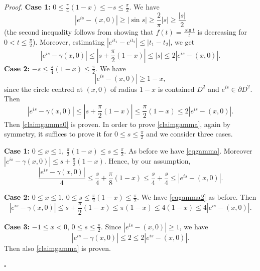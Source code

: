 \documentclass[12pt, a4paper]{article}
\newenvironment{proof}{\noindent\emph{Proof.}}{\hfill$\square$\medskip}
\renewcommand{\(}{\left(}
\renewcommand{\)}{\right)}
\begin{document}
\begin{proof}
\noindent\textbf{Case 1:} $0\le \frac{\pi}{4}(1-x)\le -s\le\frac{\pi}{2}$. 
We have
\begin{equation}\label{eqgamma}
|e^{is}-(x,0)|\ge |\sin s| \ge \frac{2}{\pi}|s|\ge\frac{|s|}{2}
\end{equation}
(the second inequality follows from showing that $f(t)=\frac{\sin t}{t}$ is decreasing for $0<t\le \frac{\pi}{2}$).
Moreover, estimating $|e^{it_1}-e^{it_2}|\le |t_1-t_2|$, we get
$$|e^{is}-\gamma(x,0)|\le \left|s+\frac{\pi}{2}(1-x)\right|\le |s|\le 2  |e^{is}-(x,0)|.$$
\noindent\textbf{Case 2:} $-s\le \frac{\pi}{4}(1-x)\le \frac{\pi}{2}$. We have
\begin{equation}\label{eqgamma2}
|e^{is}-(x,0)|\ge 1-x,
\end{equation}
since the circle centred at $(x,0)$ of radius $1-x$ is contained $D^2$ and $e^{is}\in \partial D^2$. Then
$$|e^{is}-\gamma(x,0)|\le \left|s+\frac{\pi}{2}(1-x)\right|\le \frac{\pi}{2}(1-x) \le  2|e^{is}-(x,0)|.$$
Then \eqref{claimgamma0} is proven. In order to prove \eqref{claimgamma}, again by symmetry, it suffices to prove it for $0\le s\le \frac{\pi}{2}$ and we consider three cases.


\noindent\textbf{Case 1:} $0\le x\le 1$, $ \frac{\pi}{2}(1-x)\le s\le \frac{\pi}{2}$.
As before we have \eqref{eqgamma}.
Moreover $|e^{is}-\gamma(x,0)|\le s+\frac{\pi}{2}(1-x)$.  Hence, by our assumption,
$$\frac{|e^{is}-\gamma(x,0)|}{4}\le \frac{s}{4}+ \frac{\pi}{8}(1-x)\le \frac{s}{4}+\frac{s}{4}\le |e^{is}-(x,0)|.$$

\noindent\textbf{Case 2:} $0\le x\le 1$, $0\le s\le \frac{\pi}{2}(1-x)\le \frac{\pi}{2}$. We have \eqref{eqgamma2} as before. Then
$$|e^{is}-\gamma(x,0)|\le s+\frac{\pi}{2}(1-x)\le \pi (1-x)\le 4(1-x)\le 4 |e^{is}-(x,0)|.$$

\noindent\textbf{Case 3:} $-1\le  x< 0$, $0\le s\le \frac{\pi}{2}$. Since
$|e^{is}-(x,0)|\ge 1$, we have
$$|e^{is}-\gamma(x,0)|\le 2 \le  2 |e^{is}-(x,0)|. $$
Then also \eqref{claimgamma} is proven.

\medskip



\end{proof}
\end{document}
